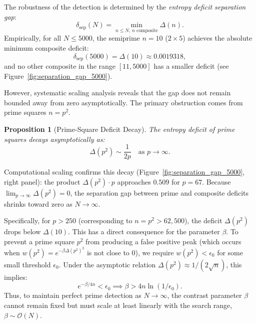 \documentclass[11pt,twoside]{article}
\newtheorem{proposition}{Proposition}
\begin{document}
	The robustness of the detection is determined by the \emph{entropy deficit separation gap}:
	\begin{equation}
		\delta_{\text{sep}}(N) = \min_{n \leq N, \, n \text{ composite}} \Delta(n).
	\end{equation}
	Empirically, for all $N \le 5000$, the semiprime $n = 10$ ($2 \times 5$) achieves the absolute minimum composite deficit:
	\begin{equation}
		\delta_{\text{sep}}(5000) = \Delta(10) \approx 0.0019318,
	\end{equation}
	and no other composite in the range $[11, 5000]$ has a smaller deficit (see Figure~\ref{fig:separation_gap_5000}).
	
	However, systematic scaling analysis reveals that the gap does not remain bounded away from zero asymptotically. The primary obstruction comes from prime squares $n = p^2$.
	
	\begin{proposition}[Prime-Square Deficit Decay]
		The entropy deficit of prime squares decays asymptotically as:
		\begin{equation}
			\Delta(p^2) \sim \frac{1}{2p} \quad \text{as } p \to \infty.
		\end{equation}
	\end{proposition}
	
	\noindent Computational scaling confirms this decay (Figure~\ref{fig:separation_gap_5000}, right panel): the product $\Delta(p^2) \cdot p$ approaches $0.509$ for $p = 67$. Because $\lim_{p\to\infty} \Delta(p^2) = 0$, the separation gap between prime and composite deficits shrinks toward zero as $N \to \infty$. 
	
	Specifically, for $p > 250$ (corresponding to $n = p^2 > 62{,}500$), the deficit $\Delta(p^2)$ drops below $\Delta(10)$. This has a direct consequence for the parameter $\beta$. To prevent a prime square $p^2$ from producing a false positive peak (which occurs when $w(p^2) = e^{-\beta \Delta(p^2)^2}$ is not close to 0), we require $w(p^2) < \epsilon_0$ for some small threshold $\epsilon_0$. Under the asymptotic relation $\Delta(p^2) \approx 1/(2\sqrt{n})$, this implies:
	\begin{equation}
		e^{-\beta / 4n} < \epsilon_0 \implies \beta > 4n \ln(1/\epsilon_0).
	\end{equation}
	Thus, to maintain perfect prime detection as $N \to \infty$, the contrast parameter $\beta$ cannot remain fixed but must scale at least linearly with the search range, $\beta \sim \mathcal{O}(N)$.
	
\end{document}
